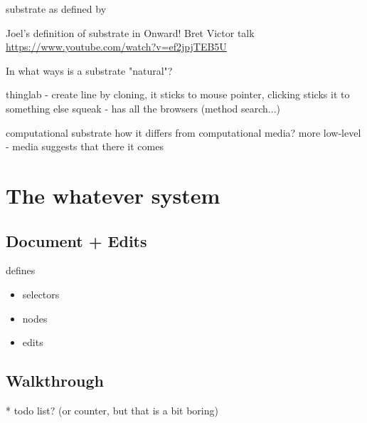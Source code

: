 \documentclass[sigconf]{acmart}
\begin{document}
substrate as defined by \cite{jakubovic-2022-ladder}

\cite{leiva-2021-rapido,cypher-1993-pbd}
\cite{chen-2023-miwa}

\cite{kleppmann-2019-local,klokmose-2024-mywebstrates}
\cite{ko-2004-whyline,ko-2009-whyline,krebs-2023-probelog}
\cite{ricciotti-2017-imperative,perera-2012-functional}
\cite{perera-2022-linked}








Joel's definition of substrate in Onward!
Bret Victor talk
\url{https://www.youtube.com/watch?v=ef2jpjTEB5U}

In what ways is a substrate "natural"?

thinglab - create line by cloning, it sticks to mouse pointer, clicking sticks it to something else
squeak - has all the browsers (method search...)


computational substrate
how it differs from computational media?
more low-level - media suggests that there it comes

\section{The whatever system}
\subsection{Document + Edits}
defines
\begin{itemize}
  \item selectors
  \item nodes
  \item edits
\end{itemize}

\subsection{Walkthrough}
* todo list? (or counter, but that is a bit boring)
\end{document}
